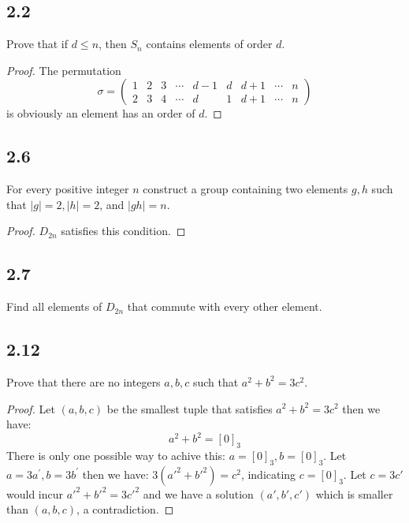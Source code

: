 \documentclass[a4paper, pdf, 12pt]{article}
\begin{document}
\subsection*{2.2}
Prove that if $d \leq n$, then $S_n$ contains elements of order $d$.
\begin{proof}
  The permutation
  $$
    \sigma = \begin{pmatrix}
      1 & 2 & 3 & \cdots & d-1 & d & d+1 & \cdots & n \\
      2 & 3 & 4 & \cdots & d   & 1 & d+1 & \cdots & n
    \end{pmatrix}
  $$
  is obviously an element has an order of $d$.
\end{proof}

\subsection*{2.6} For every positive integer $n$ construct a group containing two elements $g, h$
such that $|g| = 2, |h| = 2$, and $|gh| = n$.
\begin{proof}
  $D_{2n}$ satisfies this condition.
\end{proof}

\subsection*{2.7} Find all elements of $D_{2n}$ that commute with every other element.

\subsection*{2.12} Prove that there are no integers $a,b,c$ such that $a^2+b^2=3c^2$.
\begin{proof}
  Let $(a,b,c)$ be the smallest tuple that satisfies $a^2+b^2=3c^2$ then we have:
  $$
    a^2+b^2 = [0]_{3}
  $$
  There is only one possible way to achive this: $a = [0]_{3}, b = [0]_3$. Let $a = 3a^{'}, b = 3b^{'}$ then we have:
  $3(a'^{2} + b'^{2}) = c^{2}$, indicating $c = [0]_{3}$. Let $c = 3c'$ would incur $a'^{2} + b'^{2} = 3c'^{2}$ and we have a
  solution $(a', b', c')$ which is smaller than $(a, b, c)$, a contradiction.

\end{proof}
\end{document}

